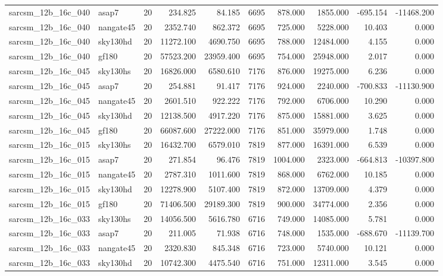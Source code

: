 \begin{tabular}{llrrrrrrrr}
sarcsm\_12b\_16c\_040 & asap7 & 20 & 234.825 & 84.185 & 6695 & 878.000 & 1855.000 & -695.154 & -11468.200 \\
sarcsm\_12b\_16c\_040 & nangate45 & 20 & 2352.740 & 862.372 & 6695 & 725.000 & 5228.000 & 10.403 & 0.000 \\
sarcsm\_12b\_16c\_040 & sky130hd & 20 & 11272.100 & 4690.750 & 6695 & 788.000 & 12484.000 & 4.155 & 0.000 \\
sarcsm\_12b\_16c\_040 & gf180 & 20 & 57523.200 & 23959.400 & 6695 & 754.000 & 25948.000 & 2.017 & 0.000 \\
sarcsm\_12b\_16c\_045 & sky130hs & 20 & 16826.000 & 6580.610 & 7176 & 876.000 & 19275.000 & 6.236 & 0.000 \\
sarcsm\_12b\_16c\_045 & asap7 & 20 & 254.881 & 91.417 & 7176 & 924.000 & 2240.000 & -700.833 & -11130.900 \\
sarcsm\_12b\_16c\_045 & nangate45 & 20 & 2601.510 & 922.222 & 7176 & 792.000 & 6706.000 & 10.290 & 0.000 \\
sarcsm\_12b\_16c\_045 & sky130hd & 20 & 12138.500 & 4917.220 & 7176 & 875.000 & 15881.000 & 3.625 & 0.000 \\
sarcsm\_12b\_16c\_045 & gf180 & 20 & 66087.600 & 27222.000 & 7176 & 851.000 & 35979.000 & 1.748 & 0.000 \\
sarcsm\_12b\_16c\_015 & sky130hs & 20 & 16432.700 & 6579.010 & 7819 & 877.000 & 16391.000 & 6.539 & 0.000 \\
sarcsm\_12b\_16c\_015 & asap7 & 20 & 271.854 & 96.476 & 7819 & 1004.000 & 2323.000 & -664.813 & -10397.800 \\
sarcsm\_12b\_16c\_015 & nangate45 & 20 & 2787.310 & 1011.600 & 7819 & 868.000 & 6762.000 & 10.185 & 0.000 \\
sarcsm\_12b\_16c\_015 & sky130hd & 20 & 12278.900 & 5107.400 & 7819 & 872.000 & 13709.000 & 4.379 & 0.000 \\
sarcsm\_12b\_16c\_015 & gf180 & 20 & 71406.500 & 29189.300 & 7819 & 900.000 & 34774.000 & 2.356 & 0.000 \\
sarcsm\_12b\_16c\_033 & sky130hs & 20 & 14056.500 & 5616.780 & 6716 & 749.000 & 14085.000 & 5.781 & 0.000 \\
sarcsm\_12b\_16c\_033 & asap7 & 20 & 211.005 & 71.938 & 6716 & 748.000 & 1535.000 & -688.670 & -11139.700 \\
sarcsm\_12b\_16c\_033 & nangate45 & 20 & 2320.830 & 845.348 & 6716 & 723.000 & 5740.000 & 10.121 & 0.000 \\
sarcsm\_12b\_16c\_033 & sky130hd & 20 & 10742.300 & 4475.540 & 6716 & 751.000 & 12311.000 & 3.545 & 0.000 \\

\end{tabular}
